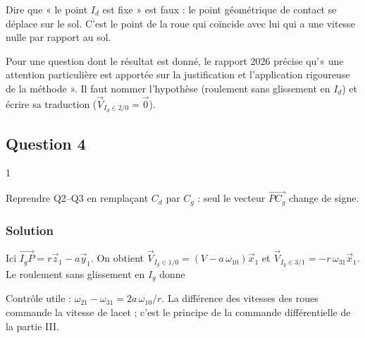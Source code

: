 \documentclass[11pt,a4paper]{article}
\newcommand{\equationajustee}[1]{%
  \sbox{\boiteequation}{$\displaystyle #1$}%
  \ifdim\wd\boiteequation>\linewidth
    \[\resizebox{\linewidth}{!}{\usebox{\boiteequation}}\]%
  \else
    \[#1\]%
  \fi}
\begin{document}
\equationajustee{\boxed{\omega_{21} = \frac{V + a\,\omega_{10}}{r}}}

\begin{piege}

Dire que « le point \(I_d\) est fixe » est faux : le point géométrique de contact se déplace sur le sol. C'est le point de la roue qui coïncide avec lui qui a une vitesse nulle par rapport au sol.

\end{piege}

\begin{jury}

Pour une question dont le résultat est donné, le rapport 2026 précise qu'« une attention particulière est apportée sur la justification et l'application rigoureuse de la méthode ». Il faut nommer l'hypothèse (roulement sans glissement en \(I_d\)) et écrire sa traduction (\(\vec V_{I_d\in 2/0} = \vec 0\)).

\end{jury}

\hypertarget{question-4}{%
\subsection{Question 4}\label{question-4}}

\begin{indication}{1}

Reprendre Q2--Q3 en remplaçant \(C_d\) par \(C_g\) : seul le vecteur \(\overrightarrow{PC_g}\) change de signe.

\end{indication}

\hypertarget{solution-3}{%
\subsubsection{Solution}\label{solution-3}}

Ici \(\overrightarrow{I_gP} = r\vec z_1 - a\vec y_1\). On obtient \(\vec V_{I_g\in 1/0} = (V - a\,\omega_{10})\vec x_1\) et \(\vec V_{I_g\in 3/1} = -r\,\omega_{31}\vec x_1\). Le roulement sans glissement en \(I_g\) donne

\equationajustee{\boxed{\omega_{31} = \frac{V - a\,\omega_{10}}{r}}}

\begin{methode}

Contrôle utile : \(\omega_{21} - \omega_{31} = 2a\,\omega_{10}/r\). La différence des vitesses des roues commande la vitesse de lacet ; c'est le principe de la commande différentielle de la partie III.

\end{methode}
\end{document}
